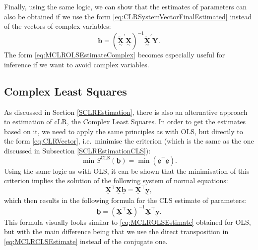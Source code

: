 \documentclass[
]{book}
\begin{document}
Finally, using the same logic, we can show that the estimates of parameters can also be obtained if we use the form \eqref{eq:CLRSystemVectorFinalEstimated} instead of the vectors of complex variables:
\begin{equation}
    \boldsymbol{b} = \left( \underset{\sim}{\mathbf{\tilde{X}}}^\prime \underset{\sim}{\mathbf{X}}\right)^{-1} \underset{\sim}{\mathbf{\tilde{X}}}^\prime {\mathbf{Y}} .
    \label{eq:MCLROLSEstimateComplex}
\end{equation}
The form \eqref{eq:MCLROLSEstimateComplex} becomes especially useful for inference if we want to avoid complex variables.

\hypertarget{complex-least-squares}{%
\subsection{Complex Least Squares}\label{complex-least-squares}}

As discussed in Section \ref{SCLREstimation}, there is also an alternative approach to estimation of cLR, the Complex Least Squares. In order to get the estimates based on it, we need to apply the same principles as with OLS, but directly to the form \eqref{eq:CLRVector}, i.e.~minimise the criterion (which is the same as the one discussed in Subsection \ref{SCLREstimationCLS}):
\begin{equation}
    \min S^{\mathrm{CLS}}(\underline{\boldsymbol{b}}) = \min \left(\underline{\mathbf{e}}^\top \underline{\mathbf{e}}\right).
    \label{eq:CLRCLSCriterion}
\end{equation}
Using the same logic as with OLS, it can be shown that the minimisation of this criterion implies the solution of the following system of normal equations:
\begin{equation*}
    \underline{\mathbf{X}}^\top \underline{\mathbf{X}} \underline{\boldsymbol{b}} = \underline{\mathbf{X}}^\top \underline{\mathbf{y}} ,
\end{equation*}
which then results in the following formula for the CLS estimate of parameters:
\begin{equation}
    \underline{\boldsymbol{b}} = \left( \underline{\mathbf{X}}^\top \underline{\mathbf{X}}\right)^{-1} \underline{\mathbf{X}}^\top \underline{\mathbf{y}} .
    \label{eq:MCLRCLSEstimate}
\end{equation}
This formula visually looks similar to \eqref{eq:MCLROLSEstimate} obtained for OLS, but with the main difference being that we use the direct transposition in \eqref{eq:MCLRCLSEstimate} instead of the conjugate one.
\end{document}
